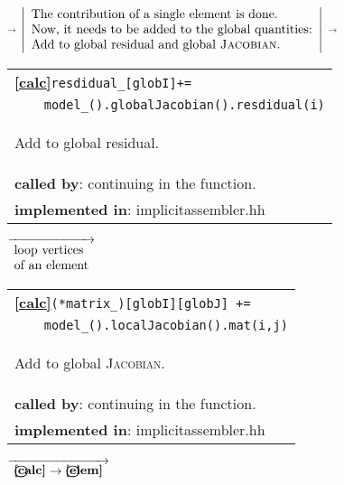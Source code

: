 \begin{landscape}
{\begin{tabular}{|l|}
	\hline
  \end{tabular}
  {\scriptsize$\overrightarrow{}$ }
  $\left|
     \begin{array}{l}
    \textnormal{The contribution of a single element is done.}\\
    \textnormal{Now, it needs to be added to the global quantities:}\\
    \textnormal{Add to global residual and global \textsc{Jacobian}.}
  \end{array}
  \right |$
    {\scriptsize$\overrightarrow{}$ }
   \begin{tabular}{|l|}
      \hline
      \textbf{\textcircled{\ref{calc}}}\verb?resdidual_[globI]+=? \\
		  \verb?    model_().globalJacobian().resdidual(i)? \\
      \begin{scriptsize}Add to global residual.\end{scriptsize}\\
      \textbf{called by}: continuing in the function. \\
      \textbf{implemented in}: implicitassembler.hh\\
	\hline
  \end{tabular}
 \nextline
   {\scriptsize$\overrightarrow{
    \begin{array}{l}
    \textnormal{loop vertices}\\
    \textnormal{of an element}
    \end{array}}$}
   \begin{tabular}{|l|}
      \hline
      \textbf{\textcircled{\ref{calc}}}\verb?(*matrix_)[globI][globJ] +=? \\
		\verb?    model_().localJacobian().mat(i,j)? \\
      \begin{scriptsize}Add to global \textsc{Jacobian}.\end{scriptsize}\\
      \textbf{called by}: continuing in the function. \\
      \textbf{implemented in}: implicitassembler.hh\\
	\hline
  \end{tabular}
    {\scriptsize$\overrightarrow{
	  \begin{array}{l}
	   \textbf{\textcircled{\ref{calc}}}\rightarrow\textbf{\textcircled{\ref{elem}}}\\
           \end{array}
    }$}
   \begin{tabular}{|l|}

\end{tabular}}
\end{landscape}
